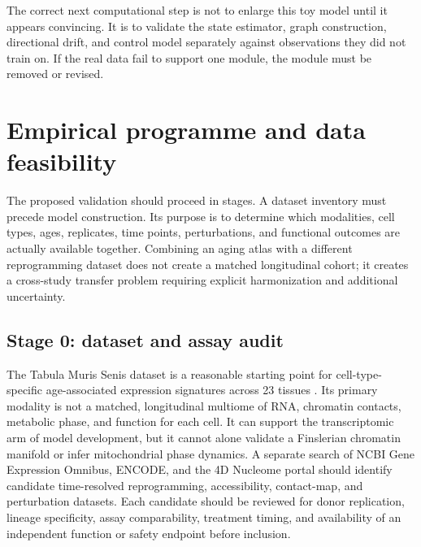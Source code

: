 \documentclass[11pt,a4paper]{article}
\theoremstyle{definition}
\theoremstyle{remark}
\begin{document}
The correct next computational step is not to enlarge this toy model until it appears convincing. It is to validate the state estimator, graph construction, directional drift, and control model separately against observations they did not train on. If the real data fail to support one module, the module must be removed or revised.

\section{Empirical programme and data feasibility}
The proposed validation should proceed in stages. A dataset inventory must precede model construction. Its purpose is to determine which modalities, cell types, ages, replicates, time points, perturbations, and functional outcomes are actually available together. Combining an aging atlas with a different reprogramming dataset does not create a matched longitudinal cohort; it creates a cross-study transfer problem requiring explicit harmonization and additional uncertainty.

\subsection{Stage 0: dataset and assay audit}
The Tabula Muris Senis dataset is a reasonable starting point for cell-type-specific age-associated expression signatures across 23 tissues \cite{TabulaMuris2020}. Its primary modality is not a matched, longitudinal multiome of RNA, chromatin contacts, metabolic phase, and function for each cell. It can support the transcriptomic arm of model development, but it cannot alone validate a Finslerian chromatin manifold or infer mitochondrial phase dynamics. A separate search of NCBI Gene Expression Omnibus, ENCODE, and the 4D Nucleome portal should identify candidate time-resolved reprogramming, accessibility, contact-map, and perturbation datasets. Each candidate should be reviewed for donor replication, lineage specificity, assay comparability, treatment timing, and availability of an independent function or safety endpoint before inclusion.
\end{document}
